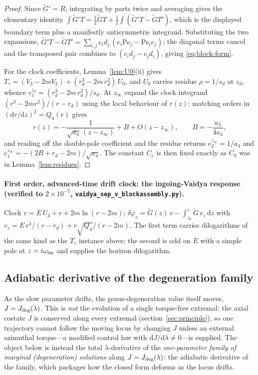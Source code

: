 \documentclass[12pt]{iopart}
\newcommand{\Jc}{J_{\rm deg}}
\newcommand{\dd}{\mathrm{d}}
\theoremstyle{plain}
\theoremstyle{definition}
\theoremstyle{plain}
\theoremstyle{remark}
\begin{document}
\begin{proof}
Since $\tilde G'=R$, integrating by parts twice and averaging gives the elementary
identity $\int\tilde G'T=\tfrac12\tilde GT+\tfrac12\int(\tilde G'T-\tilde GT')$, which is
the displayed boundary term plus a manifestly antisymmetric integrand. Substituting the
two expansions,
$\tilde G'T-\tilde GT'=\sum_{i,j}c_id_j\,(e_i\mathrm{Pe}_j-\mathrm{Pe}_ie_j)$; the
diagonal terms cancel and the transposed pair combines to $(c_id_j-c_jd_i)$, giving
\eqref{eq:block-form}.

For the clock coefficients, Lemma~\ref{lem:U0}(ii) gives
$T_\tau=(V_3-2mV_2)+(r_d^3-2m\,r_d^2)\,U_0$, and $U_0$ carries residue $\rho=1/s_d$ at
$z_d$, whence $e_1^{z_d}=(r_d^3-2m\,r_d^2)/s_d$. At $z_\infty$ expand the clock integrand
$(r^3-2mr^2)/(r-r_d)$ using the local behaviour of $r(z)$: matching orders in
$(\dd r/\dd z)^2=Q_4(r)$ gives
\[
   r(z)=-\frac{1}{\sqrt{a_4}\,(z-z_\infty)}+B+O(z-z_\infty),
   \qquad B=-\frac{a_3}{4a_4},
\]
and reading off the double-pole coefficient and the residue returns $e_2^{z_\infty}=1/a_4$
and $e_1^{z_\infty}=-(2B+r_d-2m)/\sqrt{a_4}$. The constant $C_e$ is then fixed exactly as
$C_0$ was in Lemma~\ref{lem:residues}.
\end{proof}

\paragraph{First order, advanced-time drift clock: the ingoing-Vaidya response
(verified to $2\times10^{-7}$, \texttt{vaidya\_sep\_v\_blockassembly.py}).}
Clock $v=E\,U_3+r+2m\ln(r-2m)$;
$\delta\varphi_v=\tilde G(z)\,v-\int_{z_0}^z\tilde G\,v_z\,\dd z$ with
$v_z=E\,r^3/(r-r_d)+r\sqrt{Q_4}/(r-2m)$. The first term carries dilogarithms of the
same kind as the $T_\tau$ instance above; the second is odd on $E$ with a simple pole at $z=i\omega_{\rm im}$ and
supplies the horizon dilogarithm.

\subsection{Adiabatic derivative of the degeneration family}
\label{app:tracking}
As the slow parameter drifts, the genus-degeneration value itself moves,
$J=\Jc(\lambda)$. This is \emph{not} the evolution of a single torque-free extremal:
the axial costate $J$ is conserved along every extremal
(section~\ref{sec:principle}), so one trajectory cannot follow the moving locus by
changing $J$ unless an external azimuthal torque---a modified control law with
$\dd J/\dd\lambda\neq0$---is supplied. The object below is instead the total
$\lambda$-derivative of the \emph{one-parameter family of marginal (degeneration)
solutions} along $J=\Jc(\lambda)$: the adiabatic derivative of the family, which
packages how the closed form deforms as the locus drifts.
\end{document}
